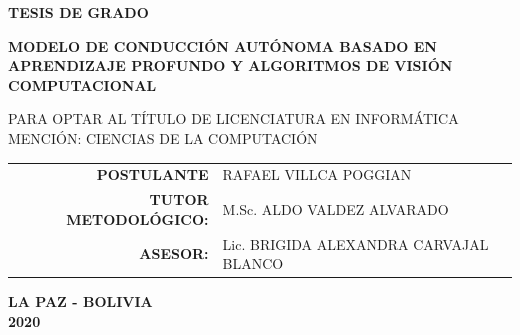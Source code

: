 \begin{titlepage}
\begin{center}
		\begin{spacing}{1.5}
			{\large \textbf{TESIS DE GRADO}}
		\end{spacing}
		\vspace{6mm}
		
		\begin{spacing}{1}
			{\large \textbf{MODELO DE CONDUCCIÓN AUTÓNOMA BASADO EN APRENDIZAJE PROFUNDO Y ALGORITMOS DE VISIÓN COMPUTACIONAL}}
		\end{spacing}
		\vspace{6mm}
		
		\begin{spacing}{1.3}
			{\textsc{PARA OPTAR AL TÍTULO DE LICENCIATURA EN INFORMÁTICA}}\\
			{\textsc{MENCIÓN: CIENCIAS DE LA COMPUTACIÓN}}
		\end{spacing}
		\vspace{6mm}
		
		\begin{spacing}{1.3}
			\begin{tabular}{rl}
				\textbf{POSTULANTE} & RAFAEL VILLCA POGGIAN\\
				\textbf{TUTOR METODOLÓGICO:} & M.Sc. ALDO VALDEZ ALVARADO\\
				\textbf{ASESOR:} & Lic. BRIGIDA ALEXANDRA CARVAJAL BLANCO \\
			\end{tabular}
		\end{spacing}
		\vspace{6mm}
		
		\begin{spacing}{1.3}
			\textbf{LA PAZ - BOLIVIA}\\
			\textbf{2020}
		\end{spacing}
		
	\end{center}
	
	
	
\end{titlepage}